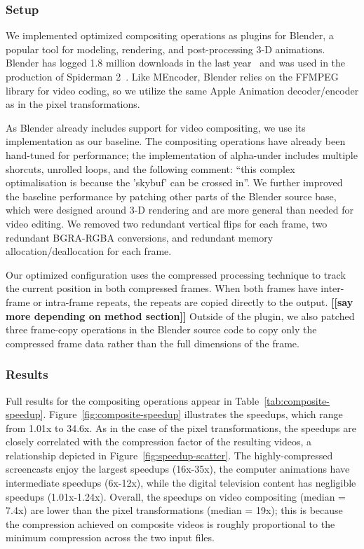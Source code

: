 \subsubsection{Setup}

We implemented optimized compositing operations as plugins for
Blender, a popular tool for modeling, rendering, and post-processing
3-D animations.  Blender has logged 1.8 million downloads in the last
year~\cite{blender-stats} and was used in the production of Spiderman
2~\cite{blender-wikipedia}.  Like MEncoder, Blender relies on the
FFMPEG library for video coding, so we utilize the same Apple
Animation decoder/encoder as in the pixel transformations.

As Blender already includes support for video compositing, we use its
implementation as our baseline.  The compositing operations have
already been hand-tuned for performance; the implementation of
alpha-under includes multiple shorcuts, unrolled loops, and the
following comment: ``this complex optimalisation is because the
'skybuf' can be crossed in''.  We further improved the baseline
performance by patching other parts of the Blender source base, which
were designed around 3-D rendering and are more general than needed
for video editing.  We removed two redundant vertical flips for each
frame, two redundant BGRA-RGBA conversions, and redundant memory
allocation/deallocation for each frame.

Our optimized configuration uses the compressed processing technique
to track the current position in both compressed frames.  When both
frames have inter-frame or intra-frame repeats, the repeats are copied
directly to the output.  {\bf [[say more depending on method
section]]} Outside of the plugin, we also patched three frame-copy
operations in
the Blender source code to copy only the compressed frame data rather
than the full dimensions of the frame.

\subsubsection{Results}

Full results for the compositing operations appear in
Table~\ref{tab:composite-speedup}.  Figure~\ref{fig:composite-speedup}
illustrates the speedups, which range from 1.01x to 34.6x.  As in the
case of the pixel transformations, the speedups are closely correlated
with the compression factor of the resulting videos, a relationship
depicted in Figure~\ref{fig:speedup-scatter}.  The highly-compressed
screencasts enjoy the largest speedups (16x-35x), the computer
animations have intermediate speedups (6x-12x), while the digital
television content has negligible speedups (1.01x-1.24x).  Overall,
the speedups on video compositing (median = 7.4x) are lower than the
pixel transformations (median = 19x); this is because the compression
achieved on composite videos is roughly proportional to the minimum
compression across the two input files.

